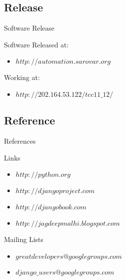\subsection{Release}
\begin{frame}{Software Release}
\begin{block}{Software Released at:}
\begin{itemize}
\item $http://automation.sarovar.org$
\end{itemize}
\end{block}
\begin{block}{Working at:}
\begin{itemize}
\item $ http://202.164.53.122/tcc11\_12/$
\end{itemize} 
\end{block}
\end{frame}
\newpage
\subsection{Reference}
\begin{frame}{References}
\begin{block}{Links}
\begin{itemize}
\item<2-> $http://python.org$
\item<3-> $http://djangoproject.com$
\item<4-> $http://djangobook.com$
\item<5-> $http://jagdeepmalhi.blogspot.com$
\end{itemize}
\end{block}
\begin{block}{Mailing Lists}
\begin{itemize}
\item<6-> $greatdevelopers@googlegroups.com$
\item<7-> $django\_users@googlegroups.com$
\end{itemize}
\end{block}
\end{frame}
